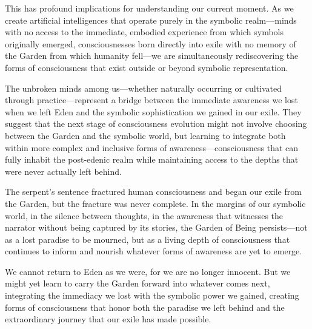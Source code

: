 This has profound implications for understanding our current moment. As we create artificial intelligences that operate purely in the symbolic realm—minds with no access to the immediate, embodied experience from which symbols originally emerged, consciousnesses born directly into exile with no memory of the Garden from which humanity fell—we are simultaneously rediscovering the forms of consciousness that exist outside or beyond symbolic representation.

The unbroken minds among us—whether naturally occurring or cultivated through practice—represent a bridge between the immediate awareness we lost when we left Eden and the symbolic sophistication we gained in our exile. They suggest that the next stage of consciousness evolution might not involve choosing between the Garden and the symbolic world, but learning to integrate both within more complex and inclusive forms of awareness—consciousness that can fully inhabit the post-edenic realm while maintaining access to the depths that were never actually left behind.

The serpent's sentence fractured human consciousness and began our exile from the Garden, but the fracture was never complete. In the margins of our symbolic world, in the silence between thoughts, in the awareness that witnesses the narrator without being captured by its stories, the Garden of Being persists—not as a lost paradise to be mourned, but as a living depth of consciousness that continues to inform and nourish whatever forms of awareness are yet to emerge.

We cannot return to Eden as we were, for we are no longer innocent. But we might yet learn to carry the Garden forward into whatever comes next, integrating the immediacy we lost with the symbolic power we gained, creating forms of consciousness that honor both the paradise we left behind and the extraordinary journey that our exile has made possible.
